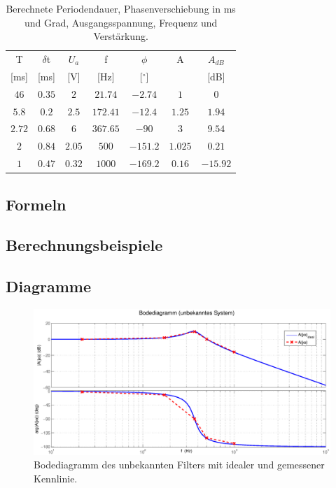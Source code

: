 \documentclass[12pt,a4paper,ngerman]{article}
\begin{document}
\begin{table}[H]
\begin{center}
\begin{tabular}{ |c|c|c|c|c|c|c| }
  \hline
    T & $\delta$t & $U_a$ & f & $\phi$ & A & $A_{dB}$\\

    [ms] & [ms] & [V] & [Hz] & [$^\circ$] & & [dB]\\
  \hline
$46$ & $0.35$ & $2$ & $21.74$ & $-2.74$ & $1$ & $0$\\
  \hline
$5.8$ & $0.2$ & $2.5$ & $172.41$ & $-12.4$ & $1.25$ & $1.94$\\
  \hline
$2.72$ & $0.68$ & $6$ & $367.65$ & $-90$ & $3$ & $9.54$\\
  \hline
$2$ & $0.84$ & $2.05$ & $500$ & $-151.2$ & $1.025$ & $0.21$\\
  \hline
$1$ & $0.47$ & $0.32$ & $1000$ & $-169.2$ & $0.16$ & $-15.92$\\
  \hline
\end{tabular}
\caption{Berechnete Periodendauer, Phasenverschiebung in ms und Grad, Ausgangsspannung, Frequenz und Verstärkung.}
\end{center}
\label{tab:1_ber}
\end{table}

\subsection{Formeln}

\subsection{Berechnungsbeispiele}

\subsection{Diagramme}
\begin{figure}[H]
\centering
\includegraphics[width=\textwidth]{figures/bode_unbekannt.eps} 
\caption{Bodediagramm des unbekannten Filters mit idealer und gemessener Kennlinie.}
\label{fig:bode_unb}
\end{figure}
\end{document}

